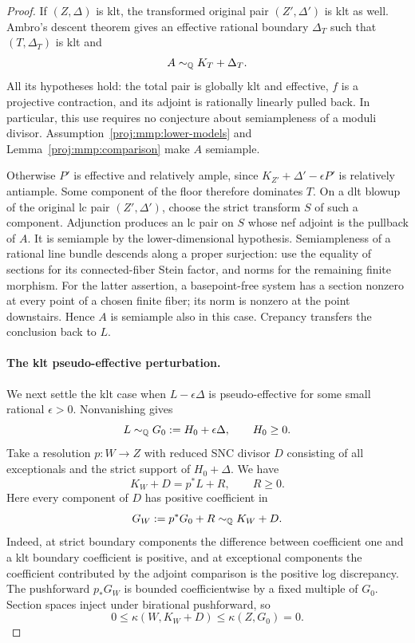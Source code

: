 \begin{proof}
If \((Z,\Delta)\) is klt, the transformed original pair
\((Z',\Delta')\) is klt as well. Ambro's descent theorem
\cite[Theorem~0.2]{Proj-Ambro2005} gives an effective rational
boundary \(\Delta_T\) such that \((T,\Delta_T)\) is klt and
\[
 A\sim_{\mathbb{Q}}K_T+\Delta_T.
\]
All its hypotheses hold: the total pair is globally klt and
effective, \(f\) is a projective contraction, and its adjoint
is rationally linearly pulled back. In particular, this use
requires no conjecture about semiampleness of a moduli divisor.
Assumption~\ref{proj:mmp:lower-models} and
Lemma~\ref{proj:mmp:comparison} make \(A\) semiample.

Otherwise \(P'\) is effective and relatively ample, since
\(K_{Z'}+\Delta'-\epsilon P'\) is relatively antiample.
Some component of the floor therefore dominates \(T\).
On a dlt blowup of the original lc pair \((Z',\Delta')\),
choose the strict transform \(S\) of such a component.
Adjunction produces an lc pair on \(S\) whose nef adjoint
is the pullback of \(A\).
It is semiample by the lower-dimensional hypothesis.
Semiampleness of a rational line bundle descends along a proper
surjection: use the equality of sections for its connected-fiber
Stein factor, and norms for the remaining finite morphism.
For the latter assertion, a basepoint-free system has a section
nonzero at every point of a chosen finite fiber; its norm is
nonzero at the point downstairs. Hence \(A\) is semiample
also in this case. Crepancy transfers the conclusion back to \(L\).

\paragraph{The klt pseudo-effective perturbation.}
We next settle the klt case when \(L-\epsilon\Delta\) is
pseudo-effective for some small rational \(\epsilon>0\).
Nonvanishing gives
\[
 L\sim_{\mathbb{Q}}G_0:=H_0+\epsilon\Delta,\qquad H_0\geq 0.
\]
Take a resolution \(p\colon W\to Z\) with reduced SNC divisor
\(D\) consisting of all exceptionals and the strict support of
\(H_0+\Delta\). We have
\[
 K_W+D=p^*L+R,\qquad R\geq 0.
\]
Here every component of \(D\) has positive coefficient in
\[
 G_W:=p^*G_0+R\sim_{\mathbb{Q}}K_W+D.
\]
Indeed, at strict boundary components the difference between
coefficient one and a klt boundary coefficient is positive,
and at exceptional components the coefficient contributed by
the adjoint comparison is the positive log discrepancy.
The pushforward \(p_*G_W\) is bounded coefficientwise by a
fixed multiple of \(G_0\). Section spaces inject under
birational pushforward, so
\[
 0\leq\kappa(W,K_W+D)\leq\kappa(Z,G_0)=0.
\]


\end{proof}

